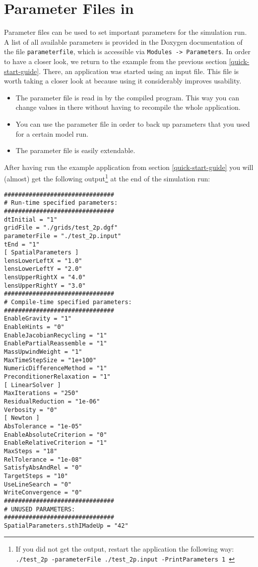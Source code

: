\section{Parameter Files in \Dumux}
\label{sec:inputFiles}
Parameter files can be used to set important parameters for the simulation run. 
A list of all available parameters is provided in the Doxygen documentation 
of the file \texttt{parameterfile}, which is accessible via \texttt{Modules -> Parameters}.
In order to have a closer look, we return to the example from the 
previous section \ref{quick-start-guide}. There, an application was started using an input file. 
This file is worth taking a closer look at because using it considerably improves usability. 

\begin{itemize}
 \item The parameter file is read in by the compiled program. This way you can change 
values in there without having to recompile the whole application. 
\item You can use the parameter file in order to back up parameters that you used for a certain model run. 
\item The parameter file is easily extendable. 
\end{itemize}

After having run the example application from section \ref{quick-start-guide} you will (almost) get the following output\footnote{If you did not get the output, restart the application the following way:
  \texttt{./test{\_}2p -parameterFile ./test\_2p.input -PrintParameters 1 }} at the end of the simulation run:
\begin{lstlisting}[style=Bash]
###############################
# Run-time specified parameters:
###############################
dtInitial = "1"
gridFile = "./grids/test_2p.dgf"
parameterFile = "./test_2p.input"
tEnd = "1"
[ SpatialParameters ]
lensLowerLeftX = "1.0"
lensLowerLeftY = "2.0"
lensUpperRightX = "4.0"
lensUpperRightY = "3.0"
###############################
# Compile-time specified parameters:
###############################
EnableGravity = "1"
EnableHints = "0"
EnableJacobianRecycling = "1"
EnablePartialReassemble = "1"
MassUpwindWeight = "1"
MaxTimeStepSize = "1e+100"
NumericDifferenceMethod = "1"
PreconditionerRelaxation = "1"
[ LinearSolver ]
MaxIterations = "250"
ResidualReduction = "1e-06"
Verbosity = "0"
[ Newton ]
AbsTolerance = "1e-05"
EnableAbsoluteCriterion = "0"
EnableRelativeCriterion = "1"
MaxSteps = "18"
RelTolerance = "1e-08"
SatisfyAbsAndRel = "0"
TargetSteps = "10"
UseLineSearch = "0"
WriteConvergence = "0"
###############################
# UNUSED PARAMETERS:
###############################
SpatialParameters.sthIMadeUp = "42"
\end{lstlisting}

